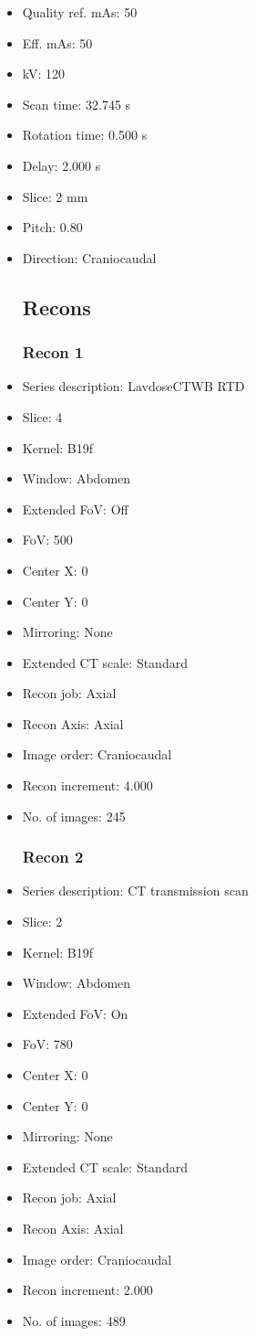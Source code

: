 \documentclass[12pt]{article}
\begin{document}
\begin{itemize}[noitemsep]
\subsection{Scan}
\item Quality ref. mAs: 50\item Eff. mAs: 50\item kV: 120\item Scan time: 32.745 s\item Rotation time: 0.500 s\item Delay: 2.000 s\item Slice: 2 mm\item Pitch: 0.80\item Direction: Craniocaudal\subsection{Recons}

\subsubsection{Recon 1}
\item Series description: LavdoseCTWB RTD
\item Slice: 4
\item Kernel: B19f
\item Window: Abdomen
\item Extended FoV: Off
\item FoV: 500
\item Center X: 0
\item Center Y: 0
\item Mirroring: None
\item Extended CT scale: Standard
\item Recon job: Axial
\item Recon Axis: Axial
\item Image order: Craniocaudal
\item Recon increment: 4.000
\item No. of images: 245
\subsubsection{Recon 2}
\item Series description: CT transmission scan
\item Slice: 2
\item Kernel: B19f
\item Window: Abdomen
\item Extended FoV: On
\item FoV: 780
\item Center X: 0
\item Center Y: 0
\item Mirroring: None
\item Extended CT scale: Standard
\item Recon job: Axial
\item Recon Axis: Axial
\item Image order: Craniocaudal
\item Recon increment: 2.000
\item No. of images: 489

\end{itemize}
\end{document}
